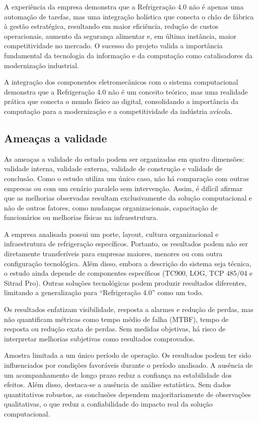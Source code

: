 \documentclass[12pt]{article}
\begin{document}
A experiência da empresa demonstra que a Refrigeração 4.0 não é apenas uma automação de tarefas, mas uma integração holística que conecta o chão de fábrica à gestão estratégica, resultando em maior eficiência, redução de custos operacionais, aumento da segurança alimentar e, em última instância, maior competitividade no mercado. O sucesso do projeto valida a importância fundamental da tecnologia da informação e da computação como catalisadores da modernização industrial.

A integração dos componentes eletromecânicos com o sistema computacional demonstra que a Refrigeração 4.0 não é um conceito teórico, mas uma realidade prática que conecta o mundo físico ao digital, consolidando a importância da computação para a modernização e a competitividade da indústria avícola.

\subsection{Ameaças a validade}

As ameaças a validade do estudo podem ser organizadas em quatro dimensões: validade interna, validade externa, validade de construção e validade de conclusão.
Como o estudo utiliza um único caso, não há comparação com outras empresas ou com um cenário paralelo sem intervenção. Assim, é difícil afirmar que as melhorias observadas resultam exclusivamente da solução computacional e não de outros fatores, como mudanças organizacionais, capacitação de funcionários ou melhorias físicas na infraestrutura.

A empresa analisada possui um porte, layout, cultura organizacional e infraestrutura de refrigeração específicos. Portanto, os resultados podem não ser diretamente transferíveis para empresas maiores, menores ou com outra configuração tecnológica. Além disso, embora a descrição do sistema seja técnica, o estudo ainda depende de componentes específicos (TC900, LOG, TCP 485/04 e Sitrad Pro). Outras soluções tecnológicas podem produzir resultados diferentes, limitando a generalização para “Refrigeração 4.0” como um todo.


Os resultados enfatizam visibilidade, resposta a alarmes e redução de perdas, mas não quantificam métricas como tempo médio de falha (MTBF), tempo de resposta ou redução exata de perdas. Sem medidas objetivas, há risco de interpretar melhorias subjetivas como resultados comprovados.


Amostra limitada a um único período de operação. Os resultados podem ter sido influenciados por condições favoráveis durante o período analisado. A ausência de um acompanhamento de longo prazo reduz a confiança na estabilidade dos efeitos. Além disso, destaca-se a ausência de análise estatística. Sem dados quantitativos robustos, as conclusões dependem majoritariamente de observações qualitativas, o que reduz a confiabilidade do impacto real da solução computacional.
\end{document}
